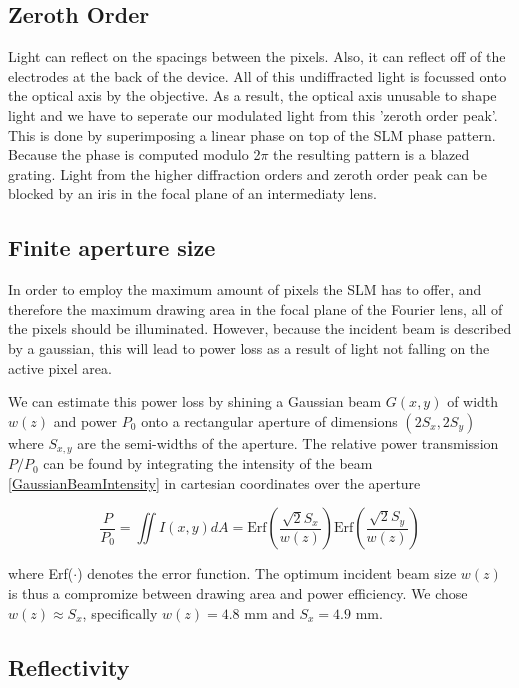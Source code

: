 \subsection{Zeroth Order}

Light can reflect on the spacings between the pixels. Also, it can reflect off of the electrodes at the back of the device. All of this undiffracted light is focussed onto the optical axis by the objective. As a result, the optical axis unusable to shape light and we have to seperate our modulated light from this 'zeroth order peak'. This is done by superimposing a linear phase on top of the SLM phase pattern. Because the phase is computed modulo 2$\pi$ the resulting pattern is a blazed grating. Light from the higher diffraction orders and zeroth order peak can be blocked by an iris in the focal plane of an intermediaty lens. 
    
\subsection{Finite aperture size}

In order to employ the maximum amount of pixels the SLM has to offer, and therefore the maximum drawing area in the focal plane of the Fourier lens, all of the pixels should be illuminated. However, because the incident beam is described by a gaussian, this will lead to power loss as a result of light not falling on the active pixel area. 
    
We can estimate this power loss by shining a Gaussian beam $G(x,y)$ of width $w(z)$ and power $P_0$ onto a rectangular aperture of dimensions $(2S_x, 2S_y)$ where $S_{x,y}$ are the semi-widths of the aperture. The relative power transmission $P/P_0$ can be found by integrating the intensity of the beam \cref{GaussianBeamIntensity} in cartesian coordinates over the aperture

\begin{equation}\label{RectAperturePower}
    \frac{P}{P_0} =
    \iint I(x,y) dA=
    \text{Erf}\left(\frac{\sqrt{2}S_x}{w(z)}\right) \text{Erf}\left(\frac{\sqrt{2}S_y}{w(z)}\right)
\end{equation}

where Erf($\cdot$) denotes the error function. The optimum incident beam size $w(z)$ is thus a compromize between drawing area and power efficiency. We chose $w(z) \approx S_{x}$, specifically $w(z) = 4.8$ mm and $S_x = 4.9$ mm. 

\subsection{Reflectivity}

